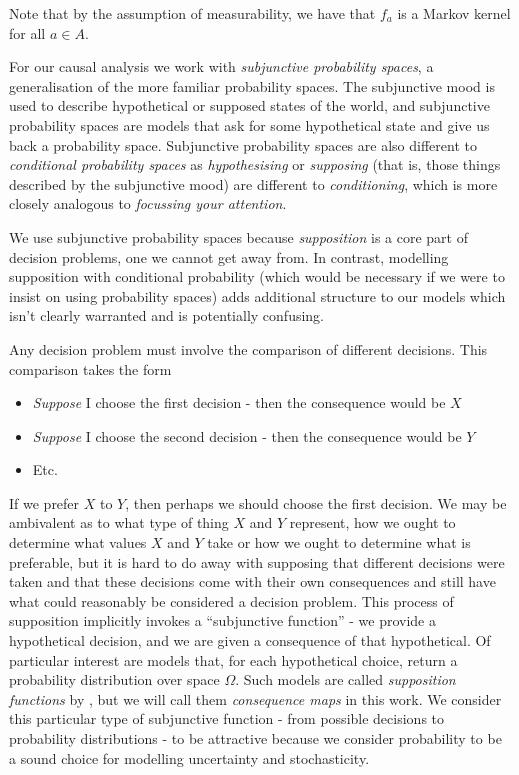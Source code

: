 Note that by the assumption of measurability, we have that $f_a$ is a Markov kernel for all $a\in A$.

For our causal analysis we work with \emph{subjunctive probability spaces}, a generalisation of the more familiar probability spaces. The subjunctive mood is used to describe hypothetical or supposed states of the world, and subjunctive probability spaces are models that ask for some hypothetical state and give us back a probability space. Subjunctive probability spaces are also different to \emph{conditional probability spaces} \citet{renyi_conditional_1956} as \emph{hypothesising} or \emph{supposing} (that is, those things described by the subjunctive mood) are different to \emph{conditioning}, which is more closely analogous to \emph{focussing your attention}.

We use subjunctive probability spaces because \emph{supposition} is a core part of decision problems, one we cannot get away from. In contrast, modelling supposition with conditional probability (which would be necessary if we were to insist on using probability spaces) adds additional structure to our models which isn't clearly warranted and is potentially confusing.

Any decision problem must involve the comparison of different decisions. This comparison takes the form
\begin{itemize}
	\item \emph{Suppose} I choose the first decision - then the consequence would be $X$
	\item \emph{Suppose} I choose the second decision - then the consequence would be $Y$
	\item Etc.
\end{itemize}

If we prefer $X$ to $Y$, then perhaps we should choose the first decision. We may be ambivalent as to what type of thing $X$ and $Y$ represent, how we ought to determine what values $X$ and $Y$ take or how we ought to determine what is preferable, but it is hard to do away with supposing that different decisions were taken and that these decisions come with their own consequences and still have what could reasonably be considered a decision problem. This process of supposition implicitly invokes a ``subjunctive function'' - we provide a hypothetical decision, and we are given a consequence of that hypothetical. Of particular interest are models that, for each hypothetical choice, return a probability distribution over space $\Omega$. Such models are called \emph{supposition functions} by \citet{joyce_why_2000}, but we will call them \emph{consequence maps} in this work. We consider this particular type of subjunctive function - from possible decisions to probability distributions - to be attractive because we consider probability to be a sound choice for modelling uncertainty and stochasticity.

